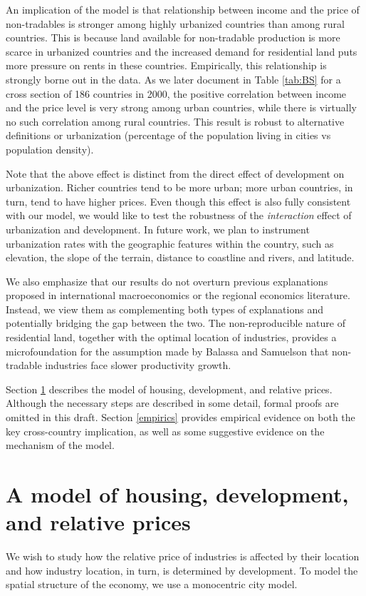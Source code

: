 \documentclass[12pt]{article}
\begin{document}
An implication of the model is that relationship between income and the price of non-tradables is stronger among highly urbanized countries than among rural countries. This is because land available for non-tradable production is more scarce in urbanized countries and the increased demand for residential land puts more pressure on rents in these countries. Empirically, this relationship is strongly borne out in the data. As we later document in Table \ref{tab:BS} for a cross section of 186 countries in 2000, the positive correlation between income and the price level is very strong among urban countries, while there is virtually no such correlation among rural countries. This result is robust to alternative definitions or urbanization (percentage of the population living in cities vs population density).

Note  that the above effect is distinct from the direct effect of development on urbanization. Richer countries tend to be more urban; more urban countries, in turn, tend to have higher prices. Even though this effect is also fully consistent with our model, we would like to test the robustness of the \emph{interaction} effect of urbanization and development. In future work, we plan to instrument urbanization rates with the geographic features within the country, such as elevation, the slope of the terrain, distance to coastline and rivers, and latitude.

We also emphasize that our results do not overturn previous explanations proposed in international macroeconomics or the regional economics literature. Instead, we view them as complementing both types of explanations and potentially bridging the gap between the two. The non-reproducible nature of residential land, together with the optimal location of industries, provides a microfoundation for the {assumption} made by Balassa and Samuelson that non-tradable industries face slower productivity growth.

Section \ref{model} describes the model of housing, development, and relative prices. Although the necessary steps are described in some detail, formal proofs are omitted in this draft. Section \ref{empirics} provides empirical evidence on both the key cross-country implication, as well as some suggestive evidence on the mechanism of the model.

\section{A model of housing, development, and relative prices}\label{model}
We wish to study how the relative price of industries is affected by their location and how industry location, in turn, is determined by development. To model the spatial structure of the economy, we use a monocentric city model. 
\end{document}
